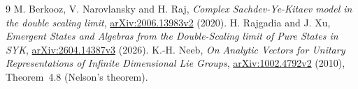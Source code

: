\documentclass[11pt]{article}
\begin{document}
\begin{thebibliography}{9}
 M. Berkooz, V. Narovlansky and H. Raj,
\emph{Complex Sachdev-Ye-Kitaev model in the double scaling limit},
\href{https://arxiv.org/abs/2006.13983v2}{arXiv:2006.13983v2} (2020).
 H. Rajgadia and J. Xu,
\emph{Emergent States and Algebras from the Double-Scaling limit
of Pure States in SYK},
\href{https://arxiv.org/abs/2604.14387v3}{arXiv:2604.14387v3} (2026).
 K.-H. Neeb,
\emph{On Analytic Vectors for Unitary Representations of Infinite
Dimensional Lie Groups},
\href{https://arxiv.org/abs/1002.4792v2}{arXiv:1002.4792v2} (2010),
Theorem~4.8 (Nelson's theorem).
\end{thebibliography}
\end{document}
